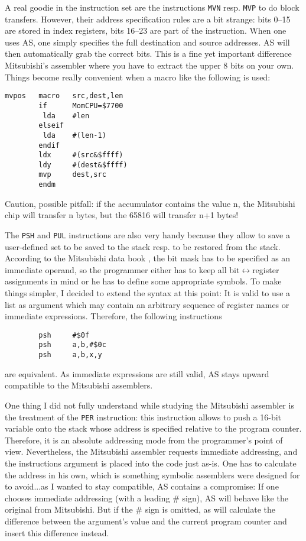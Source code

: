 \documentclass[12pt,twoside]{report}
\newcommand{\tty}[1]{{\tt #1}}
\begin{document}
A real goodie in the instruction set are the instructions \tty{MVN} resp.
\tty{MVP} to do block transfers.  However, their address specification
rules are a bit strange: bits 0--15 are stored in index registers,
bits 16--23 are part of the instruction.  When one uses AS, one
simply specifies the full destination and source addresses.  AS will
then automatically grab the correct bits.  This is a fine yet
important difference  Mitsubishi's assembler where you have to
extract the upper 8 bits on your own.  Things become really
convenient when a macro like the following is used:
\begin{verbatim}
mvpos   macro   src,dest,len
        if      MomCPU=$7700
         lda    #len
        elseif
         lda    #(len-1)
        endif
        ldx     #(src&$ffff)
        ldy     #(dest&$ffff)
        mvp     dest,src
        endm
\end{verbatim}
Caution, possible pitfall: if the accumulator contains the value n,
the Mitsubishi chip will transfer n bytes, but the 65816 will
transfer n+1 bytes!

The \tty{PSH} and \tty{PUL} instructions are also very handy because they
allow to save a user-defined set to be saved to the stack resp. to be
restored from the stack.  According to the Mitsubishi data book
\cite{Mit16}, the bit mask has to be specified as an immediate operand, so
the programmer either has to keep all bit$\leftrightarrow$register
assignments in mind or he has to define some appropriate symbols.  To make
things simpler, I decided to extend the syntax at this point: It is valid
to use a list as argument which may contain an arbitrary sequence of
register names or immediate expressions.  Therefore, the following
instructions
\begin{verbatim}
        psh     #$0f
        psh     a,b,#$0c
        psh     a,b,x,y 

\end{verbatim}
are equivalent.  As immediate expressions are still valid, AS stays
upward compatible to the Mitsubishi assemblers.

One thing I did not fully understand while studying the Mitsubishi
assembler is the treatment of the \tty{PER} instruction: this instruction
allows to push a 16-bit variable onto the stack whose address is
specified relative to the program counter.  Therefore, it is an
absolute addressing mode from the programmer's point of view. 
Nevertheless, the Mitsubishi assembler requests immediate addressing,
and the instructions argument is placed into the code just as-is. 
One has to calculate the address in his own, which is something
symbolic assemblers were designed for to avoid...as I wanted to stay
compatible, AS contains a compromise:  If one chooses immediate
addressing (with a leading \# sign), AS will behave like the original
from Mitsubishi.  But if the \# sign is omitted, as will calculate the
difference between the argument's value and the current program
counter and insert this difference instead.
\end{document}
